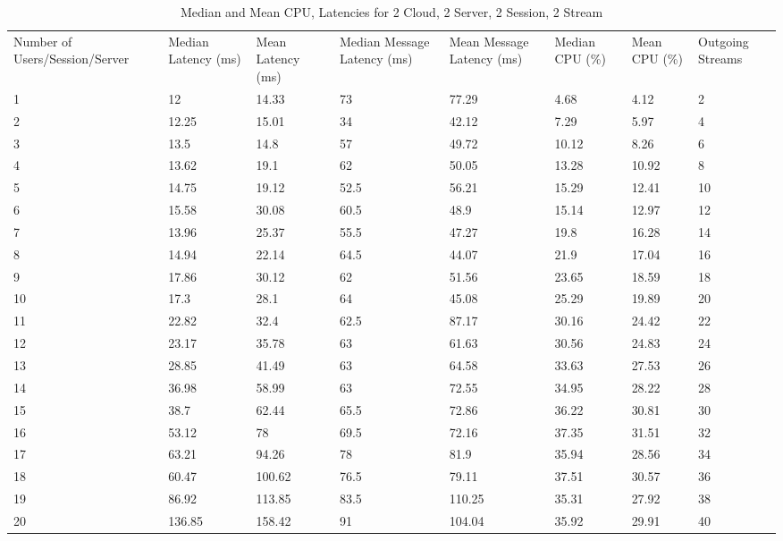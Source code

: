 \begin{table}
\caption{Median and Mean CPU, Latencies for 2 Cloud, 2 Server, 2 Session, 2 Stream}
\label{table:2cld_2serv_2sess_2str}
\begin{tabu} to\linewidth{|X[c]|X[c]|X[c]|X[c]|X[c]|X[c]|X[c]|X[c]|}
\everyrow{\hline}
\hline
Number of Users/Session/Server & Median Latency (ms) & Mean Latency (ms) & Median Message Latency (ms) & Mean Message Latency (ms) & Median CPU (\%) & Mean CPU (\%) & Outgoing Streams\\
1 & 12 & 14.33 & 73 & 77.29 & 4.68 & 4.12 & 2 \\
2 & 12.25 & 15.01 & 34 & 42.12 & 7.29 & 5.97 & 4 \\
3 & 13.5 & 14.8 & 57 & 49.72 & 10.12 & 8.26 & 6 \\
4 & 13.62 & 19.1 & 62 & 50.05 & 13.28 & 10.92 & 8 \\
5 & 14.75 & 19.12 & 52.5 & 56.21 & 15.29 & 12.41 & 10 \\
6 & 15.58 & 30.08 & 60.5 & 48.9 & 15.14 & 12.97 & 12 \\
7 & 13.96 & 25.37 & 55.5 & 47.27 & 19.8 & 16.28 & 14 \\
8 & 14.94 & 22.14 & 64.5 & 44.07 & 21.9 & 17.04 & 16 \\
9 & 17.86 & 30.12 & 62 & 51.56 & 23.65 & 18.59 & 18 \\
10 & 17.3 & 28.1 & 64 & 45.08 & 25.29 & 19.89 & 20 \\
11 & 22.82 & 32.4 & 62.5 & 87.17 & 30.16 & 24.42 & 22 \\
12 & 23.17 & 35.78 & 63 & 61.63 & 30.56 & 24.83 & 24 \\
13 & 28.85 & 41.49 & 63 & 64.58 & 33.63 & 27.53 & 26 \\
14 & 36.98 & 58.99 & 63 & 72.55 & 34.95 & 28.22 & 28 \\
15 & 38.7 & 62.44 & 65.5 & 72.86 & 36.22 & 30.81 & 30 \\
16 & 53.12 & 78 & 69.5 & 72.16 & 37.35 & 31.51 & 32 \\
17 & 63.21 & 94.26 & 78 & 81.9 & 35.94 & 28.56 & 34 \\
18 & 60.47 & 100.62 & 76.5 & 79.11 & 37.51 & 30.57 & 36 \\
19 & 86.92 & 113.85 & 83.5 & 110.25 & 35.31 & 27.92 & 38 \\
20 & 136.85 & 158.42 & 91 & 104.04 & 35.92 & 29.91 & 40 \\
\end{tabu}
\end{table}

